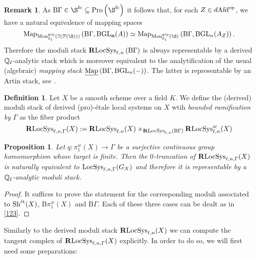 \documentclass[10pt,a4paper]{amsart}
\numberwithin{equation}{subsection}
\theoremstyle{plain}
\newtheorem{prop}[theorem]{Proposition}
\theoremstyle{definition}
\newtheorem{defi}[theorem]{Definition}
\newtheorem{rema}[theorem]{Remark}
\theoremstyle{remark}
\numberwithin{equation}{section}
\begin{document}
\begin{rema}
As $\mathrm B \Gamma \in \S^{\fc} \subseteq \pro \left( \S^{\fc} \right)$ it follows that, for each $Z \in d \mathrm{Afd}^{\mathrm{op}}$, we have a natural equivalence of mapping spaces
	\[
		\Map_{\Mon^{\grp}_{\mathbb{E}_1}(\mathcal{\cI ( \cP(\S))} )} \left( \mathrm B \Gamma, \mathbf{ \mathrm B \GLn}(A) \right) \simeq \Map_{\Mon_{\mathbb E_1}^{\grp} (\S)} \left( \mathrm B \Gamma,  \mathrm B \GLn(A_Z) \right).
	\]
Therefore the moduli stack $\mathbf R \mathrm{LocSys}_{\ell, n} \left(\mathrm B \Gamma \right) $ is always representable by a derived $\mathbb{Q}_\ell$-analytic stack which is moreover equivalent to the analytification of the usual (algebraic) \emph{mapping stack}
$\underline{\mathbf{\mathrm{Map}} }\left( \mathrm B \Gamma, \mathrm B \mathrm{GL}_n(-) \right) $. The latter is representable by an Artin stack, see \cite[Proposition 19.2.3.3.]{lurieSAG}.
\end{rema}

\begin{defi}
Let $X$ be a smooth scheme over a field $K$. We define the (derived) moduli stack of derived (pro)-\'etale local systems on $X$ wtih \emph{bounded ramification by $\Gamma$} as the fiber product
	\[
		\mathbf R \mathrm{LocSys}_{\ell, n, \Gamma} (X) : =  \mathbf R \mathrm{LocSys}_{\ell, n}(X) \times_{ 	 \mathbf R \mathrm{LocSys}_{\ell, n}( \mathrm B \Gamma 	) 	}  	\mathbf R \mathrm{LocSys}_{\ell, n}^w (X)
	\]
\end{defi}

\begin{prop}
Let $q \colon \pi_1^w(X) \to \Gamma$ be a surjective continuous group homomorphism whose target is finite. Then the $0$-truncation of $\mathbf R \mathrm{LocSys}_{\ell, n, \Gamma}(X) $ is naturally equivalent to $\mathrm{LocSys}_{\ell, n, \Gamma}(G_X) $ and therefore it is representable by a $\mathbb{Q}_{\ell}$-analytic
moduli stack.
\end{prop}

\begin{proof}
It suffices to prove the statement for the corresponding moduli associated to $\mathrm{Sh}^{\text{\'et}}(X)$, $\mathrm B \pi_1^w(X)$ and $\mathrm B \Gamma$. Each of these three cases can be dealt as in \cref{123}.
\end{proof}

Similarly to the derived moduli stack $\mathbf R \mathrm{LocSys}_{\ell, n}(X)$ we can compute the tangent complex of $\mathbf R \mathrm{LocSys}_{\ell, n, \Gamma}(X)$ explicitly. In order to do so, we will first need some preparations:
\end{document}
